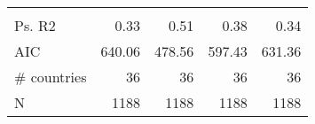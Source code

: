 \begin{tabular}{lrrrr}
                           &                    &                    &                    &                    \\
                    Ps. R2 &               0.33 &               0.51 &               0.38 &               0.34 \\
                       AIC &             640.06 &             478.56 &             597.43 &             631.36 \\
               # countries &                 36 &                 36 &                 36 &                 36 \\
                         N &               1188 &               1188 &               1188 &               1188 \\
\bottomrule
\end{tabular}
